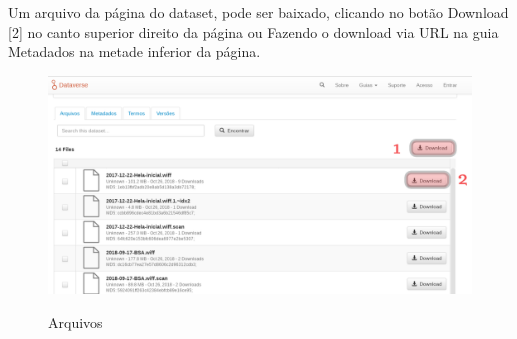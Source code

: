 \documentclass[12pt,hidelinks]{article}
\begin{document}
Um arquivo da página do dataset, pode ser baixado, clicando no botão Download [2] no canto superior direito da página ou Fazendo o download via URL na guia Metadados na metade inferior da página.

\begin{figure}[H]
\caption{Arquivos}
\centering
    \includegraphics[width=1.0\textwidth]{Prints/p3.png}
    \label{print3}
\end{figure}
\end{document}
